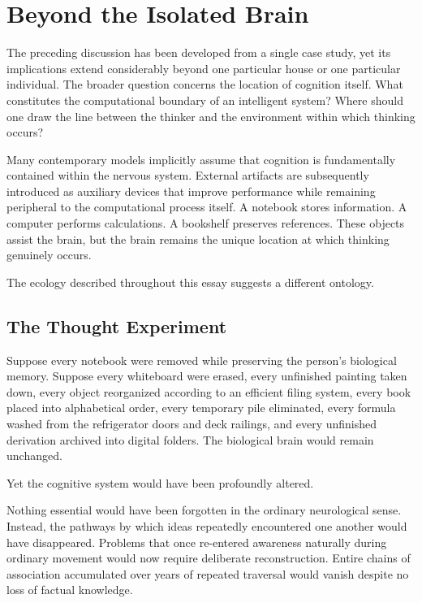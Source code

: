\documentclass[12pt,oneside]{article}
\theoremstyle{remark}
\begin{document}
\section{Beyond the Isolated Brain}

The preceding discussion has been developed from a single case study, yet its implications extend considerably beyond one particular house or one particular individual. The broader question concerns the location of cognition itself. What constitutes the computational boundary of an intelligent system? Where should one draw the line between the thinker and the environment within which thinking occurs?

Many contemporary models implicitly assume that cognition is fundamentally contained within the nervous system. External artifacts are subsequently introduced as auxiliary devices that improve performance while remaining peripheral to the computational process itself. A notebook stores information. A computer performs calculations. A bookshelf preserves references. These objects assist the brain, but the brain remains the unique location at which thinking genuinely occurs.

The ecology described throughout this essay suggests a different ontology.

\subsection{The Thought Experiment}

Suppose every notebook were removed while preserving the person's biological memory. Suppose every whiteboard were erased, every unfinished painting taken down, every object reorganized according to an efficient filing system, every book placed into alphabetical order, every temporary pile eliminated, every formula washed from the refrigerator doors and deck railings, and every unfinished derivation archived into digital folders. The biological brain would remain unchanged.

Yet the cognitive system would have been profoundly altered.

Nothing essential would have been forgotten in the ordinary neurological sense. Instead, the pathways by which ideas repeatedly encountered one another would have disappeared. Problems that once re-entered awareness naturally during ordinary movement would now require deliberate reconstruction. Entire chains of association accumulated over years of repeated traversal would vanish despite no loss of factual knowledge.
\end{document}
